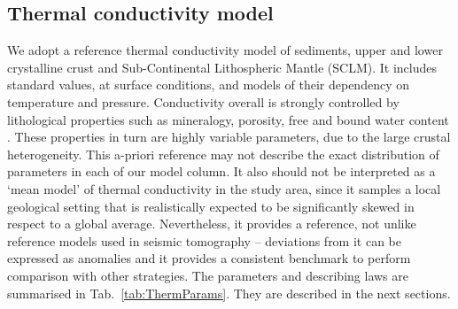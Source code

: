 \subsection{Thermal conductivity model}
\label{ss:Appl:ThermCond}
We adopt a reference thermal conductivity model of sediments, upper and lower crystalline crust and Sub-Continental Lithospheric Mantle (SCLM).
It includes standard values, at surface conditions, and models of their dependency on temperature and pressure.
Conductivity overall is strongly controlled by lithological properties such as mineralogy, porosity, free and bound water content \parencites{allen2013basin}{schon2011handbook}.
These properties in turn are highly variable parameters, due to the large crustal heterogeneity.
This a-priori reference may not describe the exact distribution of parameters in each of our model column.
It also should not be interpreted as a `mean model' of thermal conductivity in the study area, since it samples a local geological setting that is realistically expected to be significantly skewed in respect to a global average.
Nevertheless, it provides a reference, not unlike reference models used in seismic tomography -- deviations from it can be expressed as anomalies and it provides a consistent benchmark to perform comparison with other strategies.
The parameters and describing laws are summarised in Tab.~\ref{tab:ThermParams}.
They are described in the next sections.

